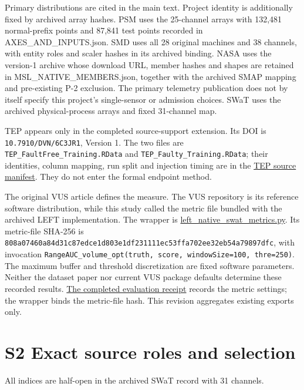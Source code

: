 \documentclass[
  english,
  9pt,
]{article}
\begin{document}
Primary distributions are cited in the main text. Project identity is
additionally fixed by archived array hashes. PSM uses the 25-channel
arrays with 132,481 normal-prefix points and 87,841 test points recorded
in AXES\_AND\_INPUTS.json. SMD uses all 28 original machines and 38
channels, with entity roles and scaler hashes in its archived binding.
NASA uses the version-1 archive whose download URL, member hashes and
shapes are retained in MSL\_NATIVE\_MEMBERS.json, together with the
archived SMAP mapping and pre-existing P-2 exclusion. The primary
telemetry publication does not by itself specify this project's
single-sensor or admission choices. SWaT uses the archived
physical-process arrays and fixed 31-channel map.

TEP appears only in the completed source-support extension. Its DOI is
\texttt{10.7910/DVN/6C3JR1}, Version 1. The two files are
\texttt{TEP\_FaultFree\_Training.RData} and
\texttt{TEP\_Faulty\_Training.RData}; their identities, column mapping,
run split and injection timing are in the
\href{../../docs/experiments/native_tep_support_20261125/INPUT.json}{TEP
source manifest}. They do not enter the formal endpoint method.

The original VUS article defines the measure. The VUS repository is its
reference software distribution, while this study called the metric file
bundled with the archived LEFT implementation. The wrapper is
\href{../../src/hybrid_tsad/left_native_swat_metrics.py}{left\_native\_swat\_metrics.py}.
Its metric-file SHA-256 is
\texttt{808a07460a84d31c87edce1d803e1df231111ec53ffa702ee32eb54a79897dfc},
with invocation
\texttt{RangeAUC\_volume\_opt(truth,\ score,\ windowSize=100,\ thre=250)}.
The maximum buffer and threshold discretization are fixed software
parameters. Neither the dataset paper nor current VUS package defaults
determine these recorded results.
\href{../../docs/experiments/native_endpoint_external_20261125/EVALUATION.json}{The
completed evaluation receipt} records the metric settings; the wrapper
binds the metric-file hash. This revision aggregates existing exports
only.

\section{S2 Exact source roles and
selection}\label{s2-exact-source-roles-and-selection}

All indices are half-open in the archived SWaT record with 31 channels.
\end{document}
